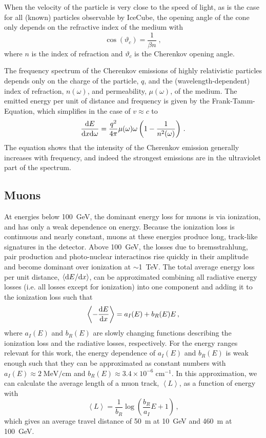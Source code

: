 When the velocity of the particle is very close to the speed of light, as is the case for all (known) particles observable by IceCube, the opening angle of the cone only depends on the refractive index of the medium with
\begin{equation}
    \cos(\vartheta_c)=\frac{1}{\beta n}\;,
\end{equation}
where $n$ is the index of refraction and $\vartheta_c$ is the Cherenkov opening angle.

The frequency spectrum of the Cherenkov emissions of highly relativistic particles depends only on the charge of the particle, $q$, and the (wavelength-dependent) index of refraction, $n(\omega)$, and permeability, $\mu(\omega)$, of the medium. The emitted energy per unit of distance and frequency is given by the Frank-Tamm-Equation, which simplifies in the case of $v\approx c$ to
\begin{equation}
    \frac{\mathrm{d} E}{\mathrm{d} x \mathrm{d} \omega}=\frac{q^2}{4\pi}\mu(\omega)\omega\left(1-\frac{1}{n^2(\omega)}\right)\,.
\end{equation}
The equation shows that the intensity of the Cherenkov emission generally increases with frequency, and indeed the strongest emissions are in the ultraviolet part of the spectrum.

\subsection{Muons}
\label{sec:muon-propagation}
At energies below 100~GeV, the dominant energy loss for muons is via ionization, and has only a weak dependence on energy. Because the ionization loss is continuous and nearly constant, muons at these energies produce long, track-like signatures in the detector. Above 100~GeV, the losses due to bremsstrahlung, pair production and photo-nuclear interactinos rise quickly in their amplitude and become dominant over ionization at $\sim$1~TeV. The total average energy loss per unit distance, $\left<\mathrm{d} E/\mathrm{d} x\right>$, can be approximated combining all radiative energy losses (i.e. all losses except for ionization) into one component and adding it to the ionization loss such that
\begin{equation}
    \left<-\frac{\mathrm{d} E}{\mathrm{d} x}\right> = a_I(E) + b_R(E)E\,,
\end{equation}
where $a_I(E)$ and $b_R(E)$ are slowly changing functions describing the ionization loss and the radiative losses, respectively\cite{muonstoppingpower}. For the energy ranges relevant for this work, the energy dependence of $a_I(E)$ and $b_R(E)$ is weak enough such that they can be approximated as constant numbers with $a_I(E)\approx 2\;\mathrm{MeV/cm}$ and $b_R(E)\approx3.4\times10^{-6}\;\mathrm{cm^{-1}}$\cite{muonstoppingpower}. In this approximation, we can calculate the average length of a muon track, $\left<L\right>$, as a function of energy with
\begin{equation}
    \left<L\right>=\frac{1}{b_R}\log\left(\frac{b_R}{a_I}E + 1\right)\,,
\end{equation}
which gives an average travel distance of 50~m at 10~GeV and 460~m at 100~GeV.

